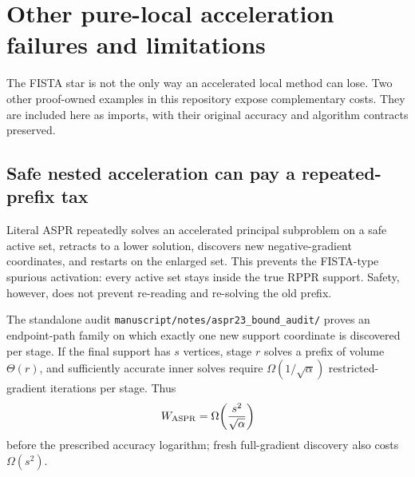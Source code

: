 \section{Other pure-local acceleration failures and limitations}
\label{sec:signed-star-other-failures}

The FISTA star is not the only way an accelerated local method can lose.  Two
other proof-owned examples in this repository expose complementary costs.
They are included here as imports, with their original accuracy and algorithm
contracts preserved.

\subsection{Safe nested acceleration can pay a repeated-prefix tax}

Literal ASPR repeatedly solves an accelerated principal subproblem on a safe
active set, retracts to a lower solution, discovers new negative-gradient
coordinates, and restarts on the enlarged set.  This prevents the FISTA-type
spurious activation: every active set stays inside the true RPPR support.
Safety, however, does not prevent re-reading and re-solving the old prefix.

The standalone audit
\texttt{manuscript/notes/aspr23\_bound\_audit/} proves an endpoint-path
family on which exactly one new support coordinate is discovered per stage.
If the final support has $s$ vertices, stage $r$ solves a prefix of volume
$\Theta(r)$, and sufficiently accurate inner solves require
$\Omega(1/\sqrt\alpha)$ restricted-gradient iterations per stage.  Thus
\begin{equation}
  W_{\rm ASPR}
  =\Omega\!\left(
      \frac{s^2}{\sqrt\alpha}
    \right)
  \label{eq:signed-star-aspr-structural-lower}
\end{equation}
before the prescribed accuracy logarithm; fresh full-gradient discovery also
costs $\Omega(s^2)$.

